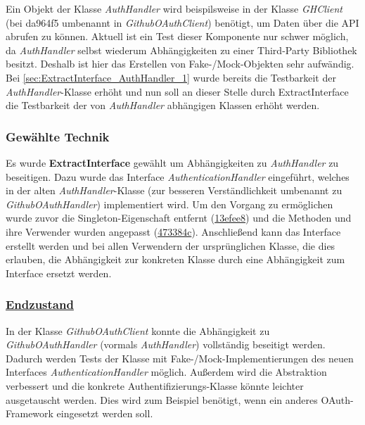 Ein Objekt der Klasse \textit{AuthHandler} wird beispilsweise in der Klasse \textit{GHClient} (bei da964f5 umbenannt in \textit{GithubOAuthClient}) benötigt, um Daten über die API abrufen zu können.
Aktuell ist ein Test dieser Komponente nur schwer möglich, da \textit{AuthHandler} selbst wiederum Abhängigkeiten zu einer Third-Party Bibliothek besitzt.
Deshalb ist hier das Erstellen von Fake-/Mock-Objekten sehr aufwändig.
Bei \ref{sec:ExtractInterface_AuthHandler_1} wurde bereits die Testbarkeit der \textit{AuthHandler}-Klasse erhöht und nun soll an dieser Stelle durch ExtractInterface die Testbarkeit der von \textit{AuthHandler} abhängigen Klassen erhöht werden.

\subsubsection*{Gewählte Technik}

Es wurde \textbf{ExtractInterface} gewählt um Abhängigkeiten zu \textit{AuthHandler} zu beseitigen.
Dazu wurde das Interface \textit{AuthenticationHandler} eingeführt, welches in der alten \textit{AuthHandler}-Klasse (zur besseren Verständlichkeit umbenannt zu \textit{GithubOAuthHandler}) implementiert wird. 
Um den Vorgang zu ermöglichen wurde zuvor die Singleton-Eigenschaft entfernt (\href{https://github.com/lukaspanni/OpenSourceStats/commit/13efee847af5b7627391d2ae6309b800727c51fd}{13efee8}) und die Methoden und ihre Verwender wurden angepasst (\href{https://github.com/lukaspanni/OpenSourceStats/commit/473384cdb4bc8e9f8269af865cf210923c42b5c5}{473384c}). 
Anschließend kann das Interface erstellt werden und bei allen Verwendern der ursprünglichen Klasse, die dies erlauben, die Abhängigkeit zur konkreten Klasse durch eine Abhängigkeit zum Interface ersetzt werden.

\subsubsection*{\href{https://github.com/lukaspanni/OpenSourceStats/tree/da964f5d7e2485f28cf19b4ec178b92805538adc/app/src/main/java/de/lukaspanni/opensourcestats/auth}{Endzustand}}

In der Klasse \textit{GithubOAuthClient} konnte die Abhängigkeit zu \textit{GithubOAuthHandler} (vormals \textit{AuthHandler}) vollständig beseitigt werden.
Dadurch werden Tests der Klasse mit Fake-/Mock-Implementierungen des neuen Interfaces \textit{AuthenticationHandler} möglich. 
Außerdem wird die Abstraktion verbessert und die konkrete Authentifizierungs-Klasse könnte leichter ausgetauscht werden.
Dies wird zum Beispiel benötigt, wenn ein anderes OAuth-Framework eingesetzt werden soll.

